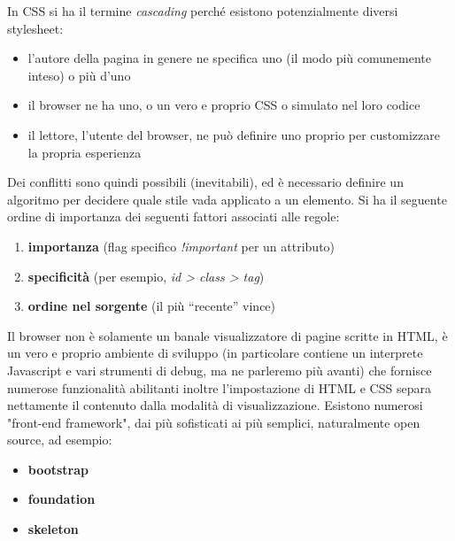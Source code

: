 \documentclass[a4paper,12pt, oneside]{book}
\begin{document}
In CSS si ha il termine \textit{cascading} perché esistono potenzialmente diversi stylesheet:
\begin{itemize}
\item l'autore della pagina in genere ne specifica uno (il modo più comunemente inteso) o più d'uno
\item il browser ne ha uno, o un vero e proprio CSS o simulato nel loro codice
\item il lettore, l’utente del browser, ne può definire uno proprio per customizzare la propria esperienza
\end{itemize}
Dei conflitti sono quindi possibili (inevitabili), ed è necessario definire un algoritmo per decidere quale stile vada applicato a un elemento. Si ha il seguente ordine di importanza dei seguenti fattori associati alle regole:
\begin{enumerate}
\item \textbf{importanza} (flag specifico \textit{!important} per un attributo)
\item \textbf{specificità} (per esempio, \textit{id > class > tag})
\item \textbf{ordine nel sorgente }(il più “recente” vince)
\end{enumerate}
Il browser non è solamente un banale visualizzatore di pagine
scritte in HTML, è un vero e proprio ambiente di sviluppo (in
particolare contiene un interprete Javascript e vari strumenti di debug, ma ne parleremo più avanti) che fornisce numerose funzionalità abilitanti inoltre l'impostazione di HTML e CSS separa nettamente il contenuto
dalla modalità di visualizzazione. Esistono numerosi "front-end framework", dai più sofisticati ai
più semplici, naturalmente open
source, ad esempio:
\begin{itemize}
\item \textbf{bootstrap}
\item \textbf{foundation}
\item \textbf{skeleton}
\end{itemize}
\end{document}
